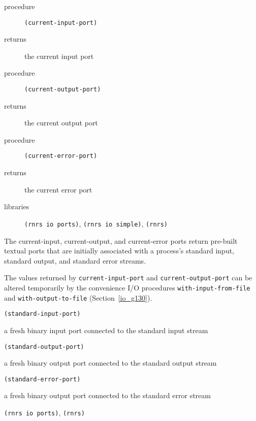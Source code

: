 \begin{description}

\label{io_s32}\item[procedure] \texttt{(current-input-port)}



\item[returns] the current input port


\item[procedure] \texttt{(current-output-port)}



\item[returns] the current output port


\item[procedure] \texttt{(current-error-port)}



\item[returns] the current error port


\item[libraries] \texttt{(rnrs io ports)}, \texttt{(rnrs io simple)}, \texttt{(rnrs)}
\end{description}


The current-input, current-output, and current-error ports return
pre-built textual ports that are initially associated with a process's
standard input, standard output, and standard error streams.


The values returned by \texttt{current-input-port} and
\texttt{current-output-port} can be altered temporarily by the
convenience I/O procedures
\texttt{with-input-from-file} and \texttt{with-output-to-file}
(Section \ref{io_g130}).

\begin{description}

\label{io_s33}\item[procedure] \texttt{(standard-input-port)}



\item[returns] a fresh binary input port connected to the standard input stream


\item[procedure] \texttt{(standard-output-port)}



\item[returns] a fresh binary output port connected to the standard output stream


\item[procedure] \texttt{(standard-error-port)}



\item[returns] a fresh binary output port connected to the standard error stream


\item[libraries] \texttt{(rnrs io ports)}, \texttt{(rnrs)}
\end{description}


